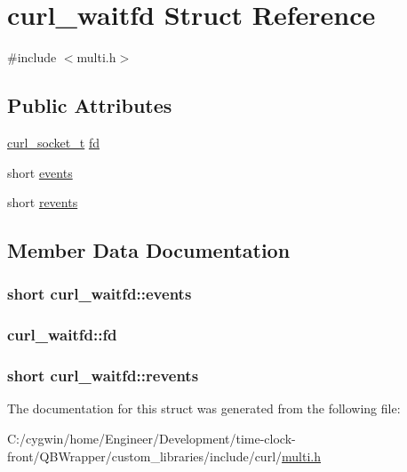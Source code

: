 \hypertarget{structcurl__waitfd}{}\section{curl\+\_\+waitfd Struct Reference}
\label{structcurl__waitfd}


{\ttfamily \#include $<$multi.\+h$>$}

\subsection*{Public Attributes}
\begin{DoxyCompactItemize}
\item 
\hyperlink{curl_8h_adb5a46d02359d2379dc7e0904c987828}{curl\+\_\+socket\+\_\+t} \hyperlink{structcurl__waitfd_ae4712fac510d50249e1a430a3d160a17}{fd}
\item 
short \hyperlink{structcurl__waitfd_ac8286d3f03be1a2f2d43a9516251f0f2}{events}
\item 
short \hyperlink{structcurl__waitfd_a14e87b528f4a052ec65edbc14b6ab080}{revents}
\end{DoxyCompactItemize}


\subsection{Member Data Documentation}
\hypertarget{structcurl__waitfd_ac8286d3f03be1a2f2d43a9516251f0f2}{}
\subsubsection[{events}]{\setlength{\rightskip}{0pt plus 5cm}short curl\+\_\+waitfd\+::events}\label{structcurl__waitfd_ac8286d3f03be1a2f2d43a9516251f0f2}
\hypertarget{structcurl__waitfd_ae4712fac510d50249e1a430a3d160a17}{}
\subsubsection[{fd}]{ curl\+\_\+waitfd\+::fd}\label{structcurl__waitfd_ae4712fac510d50249e1a430a3d160a17}
\hypertarget{structcurl__waitfd_a14e87b528f4a052ec65edbc14b6ab080}{}
\subsubsection[{revents}]{\setlength{\rightskip}{0pt plus 5cm}short curl\+\_\+waitfd\+::revents}\label{structcurl__waitfd_a14e87b528f4a052ec65edbc14b6ab080}


The documentation for this struct was generated from the following file\+:\begin{DoxyCompactItemize}
\item 
C\+:/cygwin/home/\+Engineer/\+Development/time-\/clock-\/front/\+Q\+B\+Wrapper/custom\+\_\+libraries/include/curl/\hyperlink{multi_8h}{multi.\+h}\end{DoxyCompactItemize}
